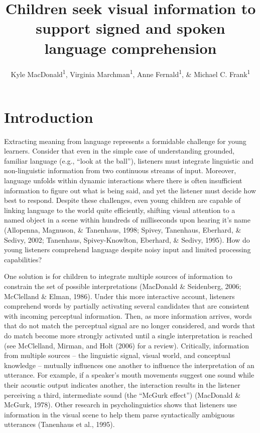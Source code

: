 \documentclass[english,floatsintext,man]{apa6}
\title{Children seek visual information to support signed and spoken language
comprehension}
\author{Kyle MacDonald\textsuperscript{1}, Virginia Marchman\textsuperscript{1}, Anne Fernald\textsuperscript{1}, \& Michael C. Frank\textsuperscript{1}}
\affiliation{
    \vspace{0.5cm}
          \textsuperscript{1} Stanford University  }
\begin{document}
\maketitle

\setcounter{secnumdepth}{0}



\hypertarget{introduction}{%
\section{Introduction}\label{introduction}}

Extracting meaning from language represents a formidable challenge for
young learners. Consider that even in the simple case of understanding
grounded, familiar language (e.g., \enquote{look at the ball}),
listeners must integrate linguistic and non-linguistic information from
two continuous streams of input. Moreover, language unfolds within
dynamic interactions where there is often insufficient information to
figure out what is being said, and yet the listener must decide how best
to respond. Despite these challenges, even young children are capable of
linking language to the world quite efficiently, shifting visual
attention to a named object in a scene within hundreds of milliseconds
upon hearing it's name (Allopenna, Magnuson, \& Tanenhaus, 1998; Spivey,
Tanenhaus, Eberhard, \& Sedivy, 2002; Tanenhaus, Spivey-Knowlton,
Eberhard, \& Sedivy, 1995). How do young listeners comprehend language
despite noisy input and limited processing capabilities?

One solution is for children to integrate multiple sources of
information to constrain the set of possible interpretations (MacDonald
\& Seidenberg, 2006; McClelland \& Elman, 1986). Under this more
interactive account, listeners comprehend words by partially activating
several candidates that are consistent with incoming perceptual
information. Then, as more information arrives, words that do not match
the perceptual signal are no longer considered, and words that do match
become more strongly activated until a single interpretation is reached
(see McClelland, Mirman, and Holt (2006) for a review). Critically,
information from multiple sources -- the linguistic signal, visual
world, and conceptual knowledge -- mutually influences one another to
influence the interpretation of an utterance. For example, if a
speaker's mouth movements suggest one sound while their acoustic output
indicates another, the interaction results in the listener perceiving a
third, intermediate sound (the \enquote{McGurk effect}) (MacDonald \&
McGurk, 1978). Other research in psycholinguistics shows that listeners
use information in the visual scene to help them parse syntactically
ambiguous utterances (Tanenhaus et al., 1995).
\end{document}
